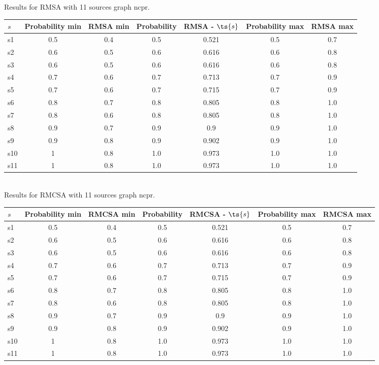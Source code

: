 \documentclass{article}
\begin{document}
\noindent Results for RMSA with 11 sources graph ncpr.

\noindent\begin{tabular}{|l|c|c|c|c|c|c|}
\hline
$s$& Probability min & RMSA min & Probability & RMSA - $\ts{s}$ & Probability max & RMSA max\\
\hline
s1 &0.5 & 0.4 & 0.5 & 0.521 & 0.5 & 0.7\\
\hline
s2 &0.6 & 0.5 & 0.6 & 0.616 & 0.6 & 0.8\\
\hline
s3 &0.6 & 0.5 & 0.6 & 0.616 & 0.6 & 0.8\\
\hline
s4 &0.7 & 0.6 & 0.7 & 0.713 & 0.7 & 0.9\\
\hline
s5 &0.7 & 0.6 & 0.7 & 0.715 & 0.7 & 0.9\\
\hline
s6 &0.8 & 0.7 & 0.8 & 0.805 & 0.8 & 1.0\\
\hline
s7 &0.8 & 0.6 & 0.8 & 0.805 & 0.8 & 1.0\\
\hline
s8 &0.9 & 0.7 & 0.9 & 0.9 & 0.9 & 1.0\\
\hline
s9 &0.9 & 0.8 & 0.9 & 0.902 & 0.9 & 1.0\\
\hline
s10 &1 & 0.8 & 1.0 & 0.973 & 1.0 & 1.0\\
\hline
s11 &1 & 0.8 & 1.0 & 0.973 & 1.0 & 1.0\\
\hline
\end{tabular}\\

\noindent Results for RMCSA with 11 sources graph ncpr.

\noindent\begin{tabular}{|l|c|c|c|c|c|c|}
\hline
$s$& Probability min & RMCSA min & Probability & RMCSA - $\ts{s}$ & Probability max & RMCSA max\\
\hline
s1 &0.5 & 0.4 & 0.5 & 0.521 & 0.5 & 0.7\\
\hline
s2 &0.6 & 0.5 & 0.6 & 0.616 & 0.6 & 0.8\\
\hline
s3 &0.6 & 0.5 & 0.6 & 0.616 & 0.6 & 0.8\\
\hline
s4 &0.7 & 0.6 & 0.7 & 0.713 & 0.7 & 0.9\\
\hline
s5 &0.7 & 0.6 & 0.7 & 0.715 & 0.7 & 0.9\\
\hline
s6 &0.8 & 0.7 & 0.8 & 0.805 & 0.8 & 1.0\\
\hline
s7 &0.8 & 0.6 & 0.8 & 0.805 & 0.8 & 1.0\\
\hline
s8 &0.9 & 0.7 & 0.9 & 0.9 & 0.9 & 1.0\\
\hline
s9 &0.9 & 0.8 & 0.9 & 0.902 & 0.9 & 1.0\\
\hline
s10 &1 & 0.8 & 1.0 & 0.973 & 1.0 & 1.0\\
\hline
s11 &1 & 0.8 & 1.0 & 0.973 & 1.0 & 1.0\\
\hline
\end{tabular}\\
\end{document}
